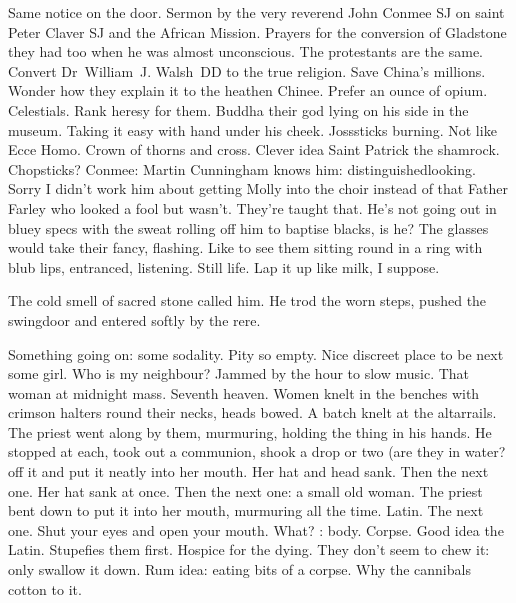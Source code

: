 Same notice on the door.
Sermon by the very reverend John Conmee SJ
on saint Peter Claver SJ and the African Mission.
Prayers for the conversion of Gladstone they had too
when he was almost unconscious.
The protestants are the same.
Convert Dr~William~J. Walsh~DD to the true religion.
Save China's millions.
Wonder how they explain it to the heathen Chinee.
Prefer an ounce of opium.
Celestials.
Rank heresy for them.
Buddha their god lying on his side in the museum.
Taking it easy
with hand under his cheek.
Josssticks burning.
Not like Ecce Homo.
Crown of thorns and cross.
Clever idea
Saint Patrick the shamrock.
Chopsticks?
Conmee:
Martin Cunningham knows him:
distinguishedlooking.
Sorry I didn't work him about getting Molly into the choir
instead of that Father Farley who looked a fool but wasn't.
They're taught that.
He's not going out in bluey specs
with the sweat rolling off him to baptise blacks,
is he?
The glasses would take their fancy, flashing.
Like to see them sitting round in a ring with blub lips,
entranced, listening.
Still life.
Lap it up like milk, I suppose.


The cold smell of sacred stone called him.
He trod the worn steps,
pushed the swingdoor
and entered softly by the rere.

Something going on: some sodality.
Pity so empty.
Nice discreet place to be next some girl.
Who is my neighbour?
Jammed by the hour to slow music.
That woman at midnight mass.
Seventh heaven.
Women knelt in the benches with crimson halters round their necks,
heads bowed.
A batch knelt at the altarrails.
The priest went along by them, murmuring,
holding the thing in his hands.
He stopped at each, took out a communion,
shook a drop or two (are they in water?
off it and put it neatly into her mouth.
Her hat and head sank.
Then the next one.
Her hat sank at once.
Then the next one:
a small old woman.
The priest bent down to put it into her mouth,
murmuring all the time.
Latin.
The next one.
Shut your eyes and open your mouth.
What?
:
body.
Corpse.
Good idea the Latin.
Stupefies them first.
Hospice for the dying.
They don't seem to chew it:
only swallow it down.
Rum idea:
eating bits of a corpse.
Why the cannibals cotton to it.

